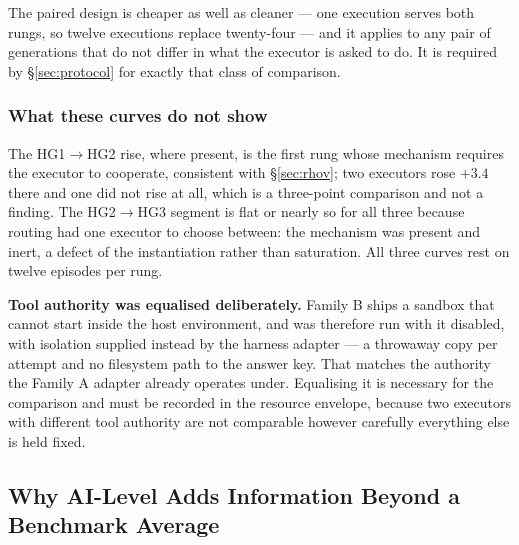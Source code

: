The paired design is cheaper as well as cleaner --- one execution serves both
rungs, so twelve executions replace twenty-four --- and it applies to any pair of
generations that do not differ in what the executor is asked to do. It is
required by \S\ref{sec:protocol} for exactly that class of comparison.

\subsubsection{What these curves do not show}

The HG1$\to$HG2 rise, where present, is the first rung whose mechanism requires the executor to cooperate, consistent with \S\ref{sec:rhov}; two executors rose $+3.4$ there and one did not rise at all, which is a three-point comparison and not a finding. The HG2$\to$HG3 segment is flat or nearly so for all three because routing had one executor to choose between: the mechanism was present and inert, a defect of the instantiation rather than saturation. All three curves rest on twelve episodes per rung.

\textbf{Tool authority was equalised deliberately.} Family B ships a sandbox that cannot start inside the host environment, and was therefore run with it disabled, with isolation supplied instead by the harness adapter --- a throwaway copy per attempt and no filesystem path to the answer key. That matches the authority the Family A adapter already operates under. Equalising it is necessary for the comparison and must be recorded in the resource envelope, because two executors with different tool authority are not comparable however carefully everything else is held fixed.

\subsection{Why AI-Level Adds Information Beyond a Benchmark Average}

